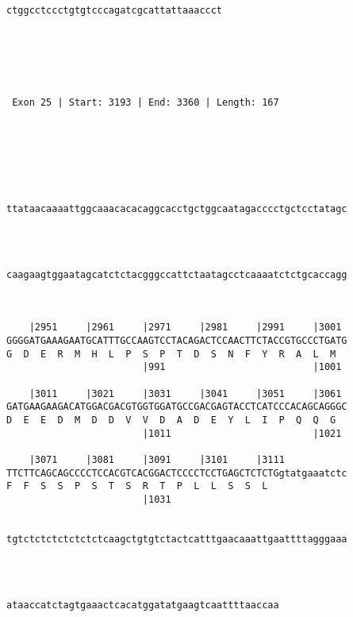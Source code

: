 \documentclass{article}
\begin{document}
\begin{Verbatim}
                                      
ctggcctccctgtgtcccagatcgcattattaaaccct
                                      
                                      
  



 Exon 25 | Start: 3193 | End: 3360 | Length: 167 





   
                                                            
ttataacaaaattggcaaacacacaggcacctgctggcaatagacccctgctcctatagc
                                                            
                                                            
   
                                                            
caagaagtggaatagcatctctacgggccattctaatagcctcaaaatctctgcaccagg
                                                            
                                                            
   
    |2951     |2961     |2971     |2981     |2991     |3001 
GGGGATGAAAGAATGCATTTGCCAAGTCCTACAGACTCCAACTTCTACCGTGCCCTGATG
G  D  E  R  M  H  L  P  S  P  T  D  S  N  F  Y  R  A  L  M  
                        |991                          |1001 
   
    |3011     |3021     |3031     |3041     |3051     |3061 
GATGAAGAAGACATGGACGACGTGGTGGATGCCGACGAGTACCTCATCCCACAGCAGGGC
D  E  E  D  M  D  D  V  V  D  A  D  E  Y  L  I  P  Q  Q  G  
                        |1011                         |1021 
   
    |3071     |3081     |3091     |3101     |3111           
TTCTTCAGCAGCCCCTCCACGTCACGGACTCCCCTCCTGAGCTCTCTGgtatgaaatctc
F  F  S  S  P  S  T  S  R  T  P  L  L  S  S  L              
                        |1031                               
   
                                                            
tgtctctctctctctctcaagctgtgtctactcatttgaacaaattgaattttagggaaa
                                                            
                                                            
   
                                                
ataaccatctagtgaaactcacatggatatgaagtcaattttaaccaa
                                                
                                                
  




\end{Verbatim}
\end{document}
